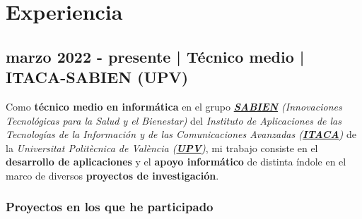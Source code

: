 \documentclass[letterpaper, 12pt, dvipsnames]{article}
\newcommand{\uniFull}{Universitat Politècnica de València}
\newcommand{\uniUrl}{https://www.upv.es/es}
\newcommand{\sabienUrl}{http://www.sabien.upv.es/}
\begin{document}
\begin{adjustwidth}{-1.5cm}{}
\end{adjustwidth}

\pagebreak

\section*{Experiencia}

\subsection*{marzo 2022 - presente | Técnico medio | ITACA-SABIEN (UPV)}

Como \textbf{técnico medio en informática} en el grupo \emph{\textbf{\href{\sabienUrl}{SABIEN}} (Innovaciones Tecnológicas para la Salud y el Bienestar)} del \emph{Instituto de Aplicaciones de las Tecnologías de la Información y de las Comunicaciones Avanzadas (\textbf{\href{http://www.itaca.upv.es/}{ITACA}})} de la \emph{{\uniFull} (\textbf{\href{\uniUrl}{UPV}})}, mi trabajo consiste en el \textbf{desarrollo de aplicaciones} y el \textbf{apoyo informático} de distinta índole en el marco de diversos \textbf{proyectos de investigación}.

\subsubsection*{Proyectos en los que he participado}
\end{document}
